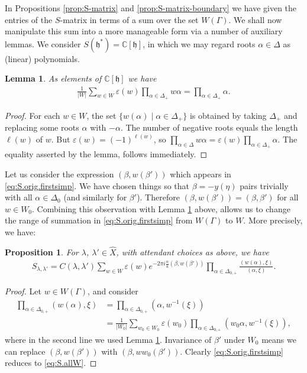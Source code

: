 \documentclass[12pt]{amsart}
\theoremstyle{plain}
\newtheorem{lemma}[thm]{Lemma}
\newtheorem{prop}[thm]{Proposition}
\theoremstyle{definition}
\numberwithin{equation}{section}
\newcommand{\laset}{\widehat{X}}
\newcommand{\al}{\alpha}
\newcommand{\la}{\lambda}
\newcommand{\D}{\Delta}
\newcommand{\C}{\mathbb{C}}
\newcommand{\h}{\mathfrak{h}}
\begin{document}
In Propositions \ref{prop:S-matrix} and \ref{prop:S-matrix-boundary} we have given the entries of the $S$-matrix in terms of a sum over the set $W(\Gamma)$. We shall now manipulate this sum into a more manageable form via a number of auxiliary lemmas. We consider $S(\h^*) = \C[\h]$, in which we may regard roots $\al \in \D$ as (linear) polynomials.
\begin{lemma}\label{lem:Macdonald}
As elements of $\C[\h]$ we have
\begin{align}\label{eq:Macdonald}
\frac{1}{|W|} \sum_{w \in W} \varepsilon(w) \prod_{\al \in \D_+} w\al = \prod_{\al \in \D_+} \al.    
\end{align}
\end{lemma}

\begin{proof}
For each $w \in W$, the set $\{w(\al) \mid \al \in \D_+\}$ is obtained by taking $\D_+$ and replacing some roots $\al$ with $-\al$. The number of negative roots equals the length $\ell(w)$ of $w$. But $\varepsilon(w) = (-1)^{\ell(w)}$, so $\prod_{\al \in \D} w\al = \varepsilon(w) \prod_{\al \in \D_+} \al$. The equality asserted by the lemma, follows immediately.
\end{proof}


Let us consider the expression $(\beta, w(\beta'))$ which appears in \eqref{eq:S.orig.firstsimp}. We have chosen things so that $\beta = -y(\eta)$ pairs trivially with all $\al \in \D_{0}$ (and similarly for $\beta'$). Therefore $(\beta, w(\beta')) = (\beta, \beta')$ for all $w \in W_0$. Combining this observation with Lemma \ref{lem:Macdonald} above, allows us to change the range of summation in \eqref{eq:S.orig.firstsimp} from $W(\Gamma)$ to $W$. More precisely, we have:
\begin{prop}\label{prop:S.allW}
For $\la$, $\la' \in \laset$, with attendant choices as above, we have
\begin{align}\label{eq:S.allW}
S_{\la, \la'} = C(\la, \la') \sum_{w \in W} \varepsilon(w) e^{-2\pi i \frac{n}{u} (\beta, w(\beta'))} \prod_{\al \in \D_{0, +}} \frac{(w(\al), \xi)}{(\al, \xi)}.
\end{align}
\end{prop}

\begin{proof}
Let $w \in W(\Gamma)$, and consider
\begin{align*}
\prod_{\al \in \D_{0, +}} (w(\al), \xi) 
%
&= \prod_{\al \in \D_{0, +}} (\al, w^{-1}(\xi)) \\
%
&= \frac{1}{|W_0|} \sum_{w_0 \in W_0} \varepsilon(w_0) \prod_{\al \in \D_{0, +}} (w_0\al, w^{-1}(\xi)),
\end{align*}
where in the second line we used Lemma \ref{lem:Macdonald}. Invariance of $\beta'$ under $W_0$ means we can replace $(\beta, w(\beta'))$ with $(\beta, ww_0(\beta'))$. Clearly \eqref{eq:S.orig.firstsimp} reduces to \eqref{eq:S.allW}.
\end{proof}
\end{document}
